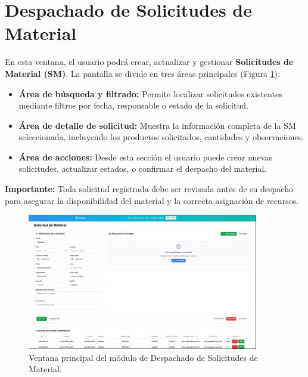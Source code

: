 \section{Despachado de Solicitudes de Material}
\begin{justify}
    
    En esta ventana, el usuario podrá crear, actualizar y gestionar \textbf{Solicitudes de Material (SM)}.  
    La pantalla se divide en tres áreas principales (Figura \ref{fig:despachado_sm}):
\end{justify}


\begin{itemize}
    \item \textbf{Área de búsqueda y filtrado:} Permite localizar solicitudes existentes mediante filtros por fecha, responsable o estado de la solicitud.
    \item \textbf{Área de detalle de solicitud:} Muestra la información completa de la SM seleccionada, incluyendo los productos solicitados, cantidades y observaciones.
    \item \textbf{Área de acciones:} Desde esta sección el usuario puede crear nuevas solicitudes, actualizar estados, o confirmar el despacho del material.
\end{itemize}

\textbf{Importante:} Toda solicitud registrada debe ser revisada antes de su despacho para asegurar la disponibilidad del material y la correcta asignación de recursos.

\begin{figure}[H]
    \centering
    \includegraphics[width=0.9\textwidth]{imgs/Almacen_General/Solicitudes_de_materia_SM/sm_general.png}
    \caption{Ventana principal del módulo de Despachado de Solicitudes de Material.}
    \label{fig:despachado_sm}
\end{figure}

